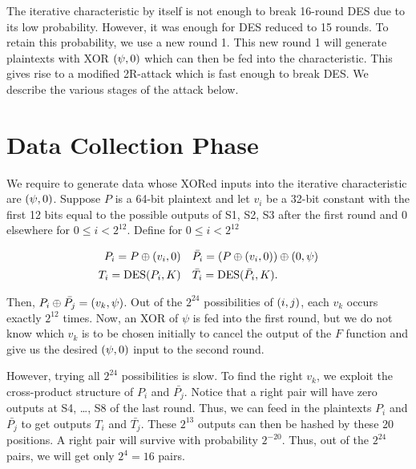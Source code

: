 \documentclass[twoside]{article}
\begin{document}



The iterative characteristic by itself is not enough to break 16-round DES due
to its low probability. However, it was enough for DES reduced to 15 rounds. To
retain this probability, we use a new round 1. This new round 1 will generate
plaintexts with XOR \((\psi,0)\) which can then be fed into the
characteristic. This gives rise to a modified 2R-attack which is fast enough to
break DES. We describe the various stages of the attack below.

\section{Data Collection Phase}

We require to generate data whose XORed inputs into the iterative characteristic
are \((\psi, 0)\). Suppose \(P\) is a 64-bit plaintext and let \(v_i\) be a
32-bit constant with the first 12 bits equal to the possible outputs of S1, S2,
S3 after the first round and 0 elsewhere for \(0 \le i < 2^{12}\). Define for
\(0 \le i < 2^{12}\)

\begin{align}
    P_i = P \oplus (v_i, 0) \quad & \bar{P_i} = (P \oplus (v_i, 0)) \oplus (0, \psi) \label{eq:pi-def} \\
    T_i = \textrm{DES}(P_i, K) \quad & \bar{T_i} = \textrm{DES}(\bar{P_i}, K). \label{eq:ti-def}
\end{align}

Then, \(P_i \oplus \bar{P_j} = (v_k, \psi)\). Out of the \(2^{24}\)
possibilities of \((i, j)\), each \(v_k\) occurs exactly \(2^{12}\) times.
Now, an XOR of \(\psi\) is fed into the first round, but we do not know which
\(v_k\) is to be chosen initially to cancel the output of the \(F\) function and
give us the desired \((\psi, 0)\) input to the second round. 

However, trying all \(2^{24}\) possibilities is slow. To find the right \(v_k\),
we exploit the cross-product structure of \(P_i\) and \(\bar{P_j}\). Notice that
a right pair will have zero outputs at S4, \dots, S8 of the last round. Thus, we
can feed in the plaintexts \(P_i\) and \(\bar{P_j}\) to get outputs \(T_i\) and
\(\bar{T_j}\). These \(2^{13}\) outputs can then be hashed by these 20
positions. A right pair will survive with probability \(2^{-20}\). Thus, out of
the \(2^{24}\) pairs, we will get only \(2^{4} = 16\) pairs.
\end{document}
